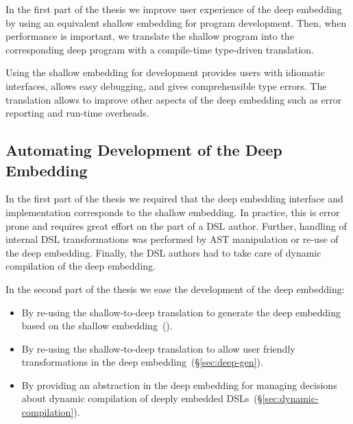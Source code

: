 In the first part of the thesis we improve user experience of the deep embedding by
 using an equivalent shallow embedding for program development. Then, when performance is
 important, we translate the shallow program into the corresponding deep program
 with a compile-time type-driven translation.

Using the shallow embedding for development provides users with idiomatic interfaces,
 allows easy debugging, and gives comprehensible type errors. The translation allows to improve other aspects of the deep embedding such as error reporting and run-time overheads.




\subsection{Automating Development of the Deep Embedding}
\label{sec:automating-developemnt}

 In the first part of the thesis we required that the deep embedding interface
 and implementation corresponds to the shallow embedding. In practice,
 this is error prone and requires great effort on the part of a DSL author. Further,
 handling of internal DSL transformations was performed by AST manipulation or
 re-use of the deep embedding. Finally, the DSL authors had to take care of dynamic
 compilation of the deep embedding.

 In the second part of the thesis we ease the development of the deep embedding: \begin{itemize}

   \item By re-using the shallow-to-deep translation to generate the deep embedding based on the
    shallow embedding~().

   \item By re-using the shallow-to-deep translation to allow user friendly
    transformations in the deep embedding~(\S \ref{sec:deep-gen}).

    \item By providing an abstraction in the deep embedding for managing decisions about
     dynamic compilation of deeply embedded DSLs~(\S \ref{sec:dynamic-compilation}).

 \end{itemize}

